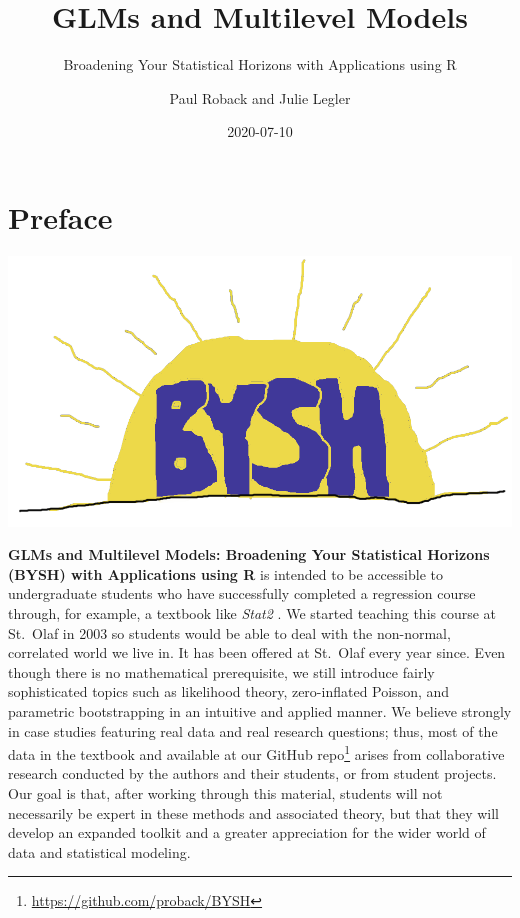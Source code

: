 \documentclass[
]{krantz}
\title{GLMs and Multilevel Models}
\subtitle{Broadening Your Statistical Horizons with Applications using R}
\author{Paul Roback and Julie Legler}
\date{2020-07-10}
\renewcommand{\href}[2]{#2\footnote{\url{#1}}}
\begin{document}
\maketitle


\thispagestyle{empty}

\setlength{\abovedisplayskip}{-5pt}
\setlength{\abovedisplayshortskip}{-5pt}

{
\hypersetup{linkcolor=}
\setcounter{tocdepth}{2}
\tableofcontents
}
\mainmatter

\hypertarget{preface}{%
\chapter*{Preface}\label{preface}}


\includegraphics[width=0.75\linewidth]{data/cover}

\textbf{GLMs and Multilevel Models: Broadening Your Statistical Horizons (BYSH) with Applications using R} \citet{RProject} is intended to be accessible to undergraduate students who have successfully completed a regression course through, for example, a textbook like \emph{Stat2} \citep{Cannon2019}. We started teaching this course at St.~Olaf in 2003 so students would be able to deal with the non-normal, correlated world we live in. It has been offered at St.~Olaf every year since. Even though there is no mathematical prerequisite, we still introduce fairly sophisticated topics such as likelihood theory, zero-inflated Poisson, and parametric bootstrapping in an intuitive and applied manner. We believe strongly in case studies featuring real data and real research questions; thus, most of the data in the textbook and \href{https://github.com/proback/BYSH}{available at our GitHub repo} arises from collaborative research conducted by the authors and their students, or from student projects. Our goal is that, after working through this material, students will not necessarily be expert in these methods and associated theory, but that they will develop an expanded toolkit and a greater appreciation for the wider world of data and statistical modeling.
\end{document}

